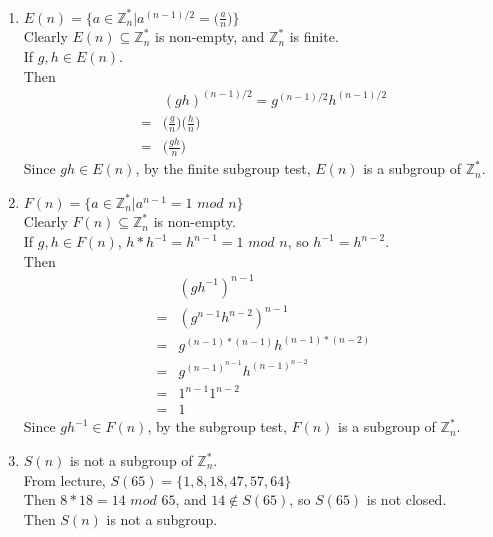 \documentclass{assignment}
\begin{document}
\begin{problemlist}
\pbitem
\begin{problem}
\end{problem}
\begin{answer}
  \\
  \begin{enumerate}
  \item
    $E(n)=\{a\in \mathbb{Z}_n^* | a^{(n-1)/2}=\Big(\frac{a}{n}\Big)\}$\\
    Clearly $E(n)\subseteq \mathbb{Z}_n^*$ is non-empty, and $\mathbb{Z}_n^*$ is finite.\\
    If $g,h\in E(n)$.\\
    Then
    \begin{align*}
      &(gh)^{(n-1)/2}=g^{(n-1)/2}h^{(n-1)/2}\\
      =&\Big(\frac{g}{n}\Big)\Big(\frac{h}{n}\Big)\\
      =&\Big(\frac{gh}{n}\Big)
    \end{align*}
    Since $gh\in E(n)$, by the finite subgroup test, $E(n)$ is a subgroup of $\mathbb{Z}_n^*$.\\
  \item
    $F(n)=\{a\in \mathbb{Z}_n^* | a^{n-1} = 1$ $mod$ $n\}$\\
    Clearly $F(n)\subseteq \mathbb{Z}_n^*$ is non-empty.\\
    If $g,h\in F(n)$, $h*h^{-1}=h^{n-1}=1$ $mod$ $n$, so $h^{-1}=h^{n-2}$.\\
    Then
    \begin{align*}
      &(gh^{-1})^{n-1}\\
      =&(g^{n-1}h^{n-2})^{n-1}\\
      =&g^{(n-1)*(n-1)}h^{(n-1)*(n-2)}\\
      =&g^{(n-1)^{n-1}}h^{(n-1)^{n-2}}\\
      =&1^{n-1}1^{n-2}\\
      =&1
    \end{align*}
    Since $gh^{-1}\in F(n)$, by the subgroup test, $F(n)$ is a subgroup of $\mathbb{Z}_n^*$.\\
  \item
    $S(n)$ is not a subgroup of $\mathbb{Z}_n^*$.\\
    From lecture, $S(65) = \{1,8,18,47,57,64\}$\\
    Then $8*18=14$ $mod$ $65$, and $14\notin S(65)$, so $S(65)$ is not closed.\\
    Then $S(n)$ is not a subgroup.\\
  \end{enumerate}
\end{answer}


\end{problemlist}
\end{document}
